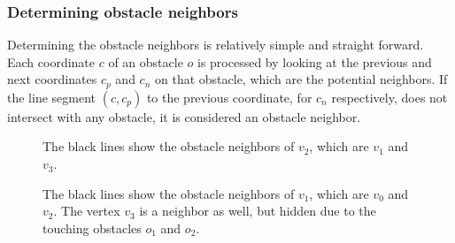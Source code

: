 			\subsubsection{Determining obstacle neighbors}
				
				Determining the obstacle neighbors is relatively simple and straight forward.
				Each coordinate $c$ of an obstacle $o$ is processed by looking at the previous and next coordinates $c_p$ and $c_n$ on that obstacle, which are the potential neighbors.
				If the line segment $(c, c_p)$ to the previous coordinate, for $c_n$ respectively, does not intersect with any obstacle, it is considered an obstacle neighbor.
				
				\begin{figure}[h]
					\begin{minipage}[t]{0.45\textwidth}
						\begin{center}
						\end{center}
						\caption{The black lines show the obstacle neighbors of $v_2$, which are $v_1$ and $v_3$.}
					\end{minipage}
					\hfill
					\begin{minipage}[t]{0.45\textwidth}
						\begin{center}
						\end{center}
						\caption{The black lines show the obstacle neighbors of $v_1$, which are $v_0$ and $v_2$. The vertex $v_3$ is a neighbor as well, but hidden due to the touching obstacles $o_1$ and $o_2$.}
					\end{minipage}
				\end{figure}
				
